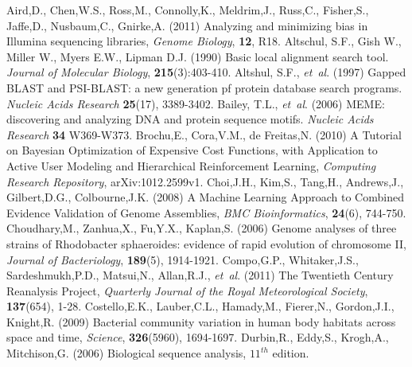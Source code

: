 \documentclass[phd,tocprelim]{cornell}
\begin{document}
%

\begin{thebibliography}{}


 Aird,D., Chen,W.S., Ross,M., Connolly,K., Meldrim,J., Russ,C., Fisher,S., Jaffe,D., Nusbaum,C., Gnirke,A. (2011) Analyzing and minimizing bias in Illumina sequencing libraries, {\it Genome Biology}, {\bf 12}, R18.
    Altschul, S.F., Gish W., Miller W., Myers E.W., Lipman D.J. (1990) Basic local alignment search tool. \textit{Journal of Molecular Biology}, \textbf{215}(3):403-410.
Altshul, S.F., \textit{et~al}. (1997) Gapped BLAST and PSI-BLAST: a new generation pf protein database search programs. \textit{Nucleic Acids Research} \textbf{25}(17), 3389-3402.
Bailey, T.L., \textit{et~al}. (2006) MEME: discovering and analyzing DNA and protein sequence motifs. \textit{Nucleic Acids Research} \textbf{34} W369-W373.
 Brochu,E., Cora,V.M., de Freitas,N. (2010) A Tutorial on Bayesian Optimization of Expensive Cost Functions, with Application to Active User Modeling and Hierarchical Reinforcement Learning, {\it Computing Research Repository}, arXiv:1012.2599v1.
 Choi,J.H., Kim,S., Tang,H., Andrews,J., Gilbert,D.G., Colbourne,J.K. (2008) A Machine Learning Approach to Combined Evidence Validation of Genome Assemblies, {\it BMC Bioinformatics}, {\bf 24}(6), 744-750.
 Choudhary,M., Zanhua,X., Fu,Y.X., Kaplan,S. (2006) Genome analyses of three strains of Rhodobacter sphaeroides: evidence of rapid evolution of chromosome II, {\it Journal of Bacteriology}, {\bf 189}(5), 1914-1921.
 Compo,G.P., Whitaker,J.S., Sardeshmukh,P.D., Matsui,N., Allan,R.J., {\it et~al}. (2011) The Twentieth Century Reanalysis Project, {\it Quarterly Journal of the Royal Meteorological Society}, {\bf 137}(654), 1-28.
 Costello,E.K., Lauber,C.L., Hamady,M., Fierer,N., Gordon,J.I., Knight,R. (2009) Bacterial community variation in human body habitats across space and time, {\it Science}, {\bf 326}(5960), 1694-1697.
    Durbin,R., Eddy,S., Krogh,A., Mitchison,G. (2006) Biological sequence analysis, $11^{th}$ edition.

\end{thebibliography}
\end{document}
